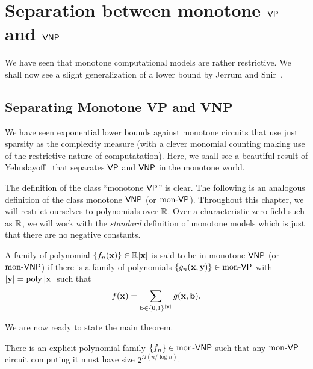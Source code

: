 \chapter{Separation between monotone $\mathsf{VP}$ and $\mathsf{VNP}$}
\label{chap:monVPVNP}

\newcommand{\monVP}{\mathrm{mon}\text{-}\VP}
\newcommand{\monVNP}{\mathrm{mon}\text{-}\VNP}
\newcommand{\Row}{\operatorname{Row}}
\newcommand{\Col}{\operatorname{Col}}


We have seen that monotone computational models are rather restrictive. We shall now see a  slight generalization of a lower bound by Jerrum and Snir~\cite{js82}. 

\section{Separating Monotone VP and VNP}\label{sec:monVPVNP}

We have seen exponential lower bounds against monotone circuits that use just sparsity as the complexity measure (with a clever monomial counting making use of the restrictive nature of computatation). 
Here, we shall see a beautiful result of Yehudayoff~\cite{Yeh18} that separates $\mathsf{VP}$ and $\mathsf{VNP}$ in the monotone world.

The definition of the class ``monotone $\mathsf{VP}$'' is clear. The following is an analogous definition of the class monotone $\mathsf{VNP}$ (or $\monVP$). Throughout this chapter, we will restrict ourselves to polynomials over $\mathbb{R}$. Over a characteristic zero field such as $\mathbb{R}$, we will work with the \emph{standard} definition of monotone models which is just that there are no negative constants.

\begin{definition} A family of polynomial $\left\{f_n(\mathbf{x})\right\} \in \mathbb{R}[\mathbf{x}]$ is said to be in monotone $\mathsf{VNP}$ (or $\monVNP$) if there is a family of polynomials $\set{g_n(\vecx, \vecy)} \in \monVP$ with $\left|\mathbf{y}\right| = \operatorname{poly}{\left|\mathbf{x}\right|}$ such that
  \[
    f(\mathbf{x}) = \sum_{\mathbf{b} \in \left\{0,1\right\}^{\left|\mathbf{y}\right|}} g(\mathbf{x}, \mathbf{b}).
  \]
\end{definition}

We are now ready to state the main theorem.

\begin{theorem}\label{thm:monVPVNPseparation}
There is an explicit polynomial family $\set{f_n} \in \monVNP$ such that any $\monVP$ circuit computing it must have size $2^{\Omega(n/\log n)}$.
\end{theorem}

